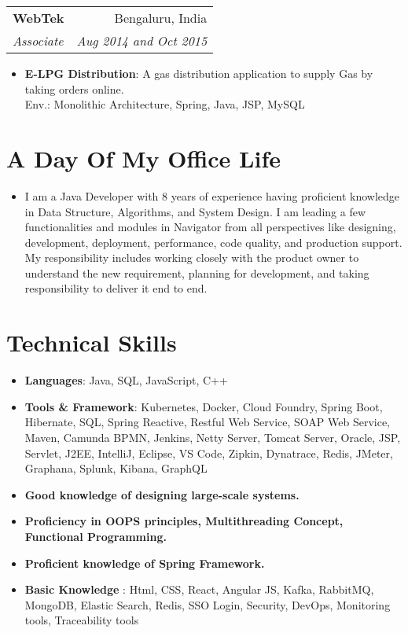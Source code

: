 \documentclass[letterpaper,11pt]{article}
\makeatletter
\newcommand{\resumeItem}[2]{
  \item\small{
    \textbf{#1}{: #2 \vspace{-2pt}}
  }
}
\newcommand{\resumeSubheading}[4]{
  \vspace{-1pt}\item
    \begin{tabular*}{0.97\textwidth}{l@{\extracolsep{\fill}}r}
      \textbf{#1} & #2 \\
      \textit{\small#3} & \textit{\small #4} \\
    \end{tabular*}\vspace{-5pt}
}
\newcommand{\resumeSubHeadingListStart}{\begin{itemize}[leftmargin=*]}
\newcommand{\resumeSubHeadingListEnd}{\end{itemize}}
\newcommand{\resumeItemListStart}{\begin{itemize}}
\makeatother
\begin{document}
    \resumeSubheading
      {WebTek}{Bengaluru, India}
      {Associate}{Aug 2014 and Oct 2015}
      \resumeItemListStart
        \resumeItem{E-LPG Distribution}
          {A gas distribution application to supply Gas by taking orders online. \\ Env.: Monolithic Architecture, Spring, Java, JSP, MySQL}

  \resumeSubHeadingListEnd
\section{A Day Of My Office Life}
\resumeSubHeadingListStart
   \item{
    \textbf{}{I am a Java Developer with 8 years of experience having proficient knowledge in Data Structure, Algorithms, and System Design. I am leading a few functionalities and modules in Navigator from all perspectives like designing, development, deployment, performance, code quality, and  production support. My responsibility includes working closely with the product owner to understand the new requirement, planning for development, and taking responsibility to deliver it end to end.}}
\resumeSubHeadingListEnd
%
\section{Technical Skills}
 \resumeSubHeadingListStart
   \item{
     \textbf{Languages}{: Java, SQL, JavaScript, C++}
     \hfill
   }
    \item{
     \textbf{Tools \& Framework}{: Kubernetes, Docker, Cloud Foundry, Spring Boot, Hibernate, SQL, Spring Reactive, Restful Web Service, SOAP Web Service, Maven, Camunda BPMN, Jenkins, Netty Server, Tomcat Server, Oracle, JSP, Servlet, J2EE, IntelliJ, Eclipse, VS Code, Zipkin, Dynatrace, Redis, JMeter, Graphana, Splunk, Kibana, GraphQL}
   }
    \item{
     \textbf{Good knowledge of designing large-scale systems.}{}
     \hfill
   }
   \item{
     \textbf{Proficiency in OOPS principles, Multithreading Concept, Functional Programming.}{}
     \hfill
   }
    \item{
     \textbf{Proficient knowledge of Spring Framework.}{}
     \hfill
   }
    \item{
     \textbf{Basic Knowledge }{: Html, CSS, React, Angular JS, Kafka, RabbitMQ, MongoDB, Elastic Search, Redis, SSO Login, Security, DevOps, Monitoring tools, Traceability tools}
     \hfill
   }
 \resumeSubHeadingListEnd


\end{document}

